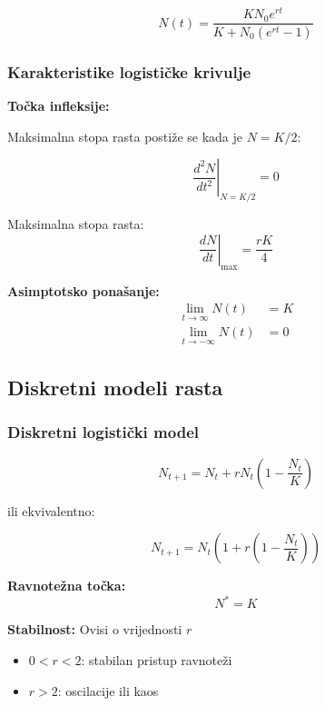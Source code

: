 \documentclass[11pt,oneside]{book}
\begin{document}
\begin{equation}
	N(t) = \frac{K N_0 e^{rt}}{K + N_0(e^{rt} - 1)}
\end{equation}

\subsubsection{Karakteristike logističke krivulje}

\textbf{Točka infleksije:}

Maksimalna stopa rasta postiže se kada je $N = K/2$:

\begin{equation}
	\left.\frac{d^2N}{dt^2}\right|_{N=K/2} = 0
\end{equation}

Maksimalna stopa rasta:
\begin{equation}
	\left.\frac{dN}{dt}\right|_{\max} = \frac{rK}{4}
\end{equation}

\textbf{Asimptotsko ponašanje:}
\begin{align}
	\lim_{t \to \infty} N(t) &= K \\
	\lim_{t \to -\infty} N(t) &= 0
\end{align}

\subsection{Diskretni modeli rasta}

\subsubsection{Diskretni logistički model}

\begin{equation}
	N_{t+1} = N_t + rN_t\left(1 - \frac{N_t}{K}\right)
\end{equation}

ili ekvivalentno:

\begin{equation}
	N_{t+1} = N_t\left(1 + r\left(1 - \frac{N_t}{K}\right)\right)
\end{equation}

\textbf{Ravnotežna točka:}
\begin{equation}
	N^* = K
\end{equation}

\textbf{Stabilnost:} Ovisi o vrijednosti $r$
\begin{itemize}
	\item $0 < r < 2$: stabilan pristup ravnoteži
	\item $r > 2$: oscilacije ili kaos
\end{itemize}
\end{document}
